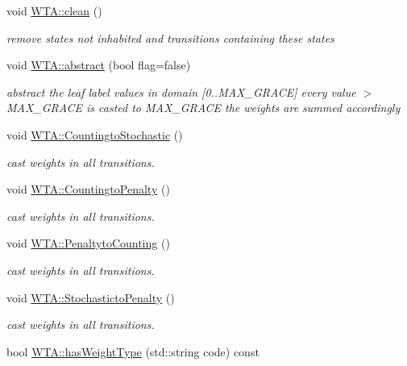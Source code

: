 \begin{DoxyCompactItemize}
void \mbox{\hyperlink{group__schemata_gaec169477bdc2cf883916c38dbc18e577}{W\+T\+A\+::clean}} ()
\begin{DoxyCompactList}\small\item\em remove states not inhabited and transitions containing these states \end{DoxyCompactList}\item 
void \mbox{\hyperlink{group__schemata_ga91e272f4f9463149cd296f48e65a4185}{W\+T\+A\+::abstract}} (bool flag=false)
\begin{DoxyCompactList}\small\item\em abstract the leaf label values in domain \mbox{[}0..M\+A\+X\+\_\+\+G\+R\+A\+CE\mbox{]} every value $>$ M\+A\+X\+\_\+\+G\+R\+A\+CE is casted to M\+A\+X\+\_\+\+G\+R\+A\+CE the weights are summed accordingly \end{DoxyCompactList}\item 
void \mbox{\hyperlink{group__schemata_ga8dfef6b591f952f0fea9dae1f5e475c7}{W\+T\+A\+::\+Countingto\+Stochastic}} ()
\begin{DoxyCompactList}\small\item\em cast weights in all transitions. \end{DoxyCompactList}\item 
void \mbox{\hyperlink{group__schemata_ga5f3a0d868bf26b504cccc53b4d55e09a}{W\+T\+A\+::\+Countingto\+Penalty}} ()
\begin{DoxyCompactList}\small\item\em cast weights in all transitions. \end{DoxyCompactList}\item 
void \mbox{\hyperlink{group__schemata_gaff1196a45ffd1400bc4004e27b167218}{W\+T\+A\+::\+Penaltyto\+Counting}} ()
\begin{DoxyCompactList}\small\item\em cast weights in all transitions. \end{DoxyCompactList}\item 
void \mbox{\hyperlink{group__schemata_ga0bddc6750b18023be6976bd5cd46a2f5}{W\+T\+A\+::\+Stochasticto\+Penalty}} ()
\begin{DoxyCompactList}\small\item\em cast weights in all transitions. \end{DoxyCompactList}\item 
\mbox{\label{group__schemata_gaf3c11e99698a2cf7ef039632dc5e2b6b}} 
bool \mbox{\hyperlink{group__schemata_gaf3c11e99698a2cf7ef039632dc5e2b6b}{W\+T\+A\+::has\+Weight\+Type}} (std\+::string code) const

\end{DoxyCompactItemize}
